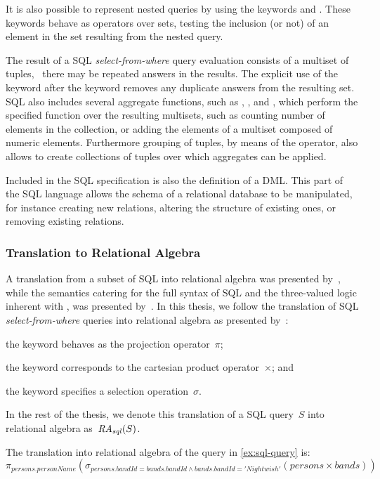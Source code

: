 It is also possible to represent nested queries by using the keywords \IN and \NOTIN.  These keywords behave as
operators over sets, testing the inclusion (or not) of an element in the set resulting from the nested query.
%

% 
The result of a \ac{SQL} \emph{select-from-where} query evaluation consists of a multiset of tuples, \ie~there may be
repeated answers in the results.  The explicit use of the \DISTINCT keyword after the \SELECT keyword removes any
duplicate answers from the resulting set.
%
\ac{SQL} also includes several aggregate functions, such as , , and , which
perform the specified function over the resulting multisets, such as counting number of elements in the collection, or
adding the elements of a multiset composed of numeric elements.
%
Furthermore grouping of tuples, by means of the  operator, also allows to create collections of tuples
over which aggregates can be applied.
%

%
Included in the SQL specification is also the definition of a DML.  This part of the SQL language allows the schema of a
relational database to be manipulated, for instance creating new relations, altering the structure of existing ones, or
removing existing relations.


\subsubsection{Translation to Relational Algebra}
\label{sec:sql-semantics}

A translation from a subset of \ac{SQL} into relational algebra was presented by~\citet{CeriGottlob:1985aa}, while the 
%
semantics catering for the full syntax of \ac{SQL} and the three-valued logic inherent with , was presented
by~\citet{NegriPelagattiSbattella:1991aa}.
%
In this thesis, we follow the translation of \ac{SQL} \emph{select-from-where} queries into relational algebra as
presented by~\citet{AbiteboulHullVianu:1995aa}:
\begin{inparaenum}[(i)]
\item the \SELECT keyword behaves as the projection operator~$\pi$;
\item the \FROM keyword corresponds to the cartesian product operator~$\times$; and
\item the \WHERE keyword specifies a selection operation~$\sigma$.
\end{inparaenum}
%
In the rest of the thesis, we denote this translation of a \ac{SQL} query~$S$ into relational algebra
as~$\mathit{RA_{\mathit{sql}}}\!\left(S\right)$.
%
\begin{example}
  The translation into relational algebra of the query in \cref{ex:sql-query} is:
  \[
  \pi_{\mathit{persons.personName}}(\sigma_{\mathit{persons.bandId} = \mathit{bands.bandId} \land \mathit{bands.bandId} = \mathit{'Nightwish'}}(\mathit{persons} \times \mathit{bands}))
  \]
\end{example}
%


